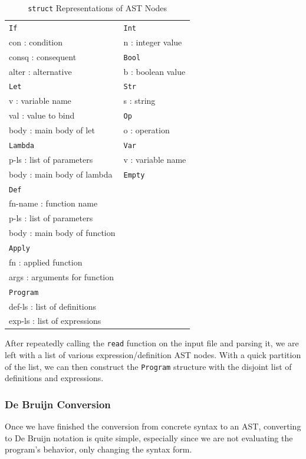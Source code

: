 \documentclass[12pt]{article}
\newcommand{\tab}{\hspace{6mm}}
\newcommand{\key}[1]{\texttt{#1}}
\begin{document}
\begin{table}[H]
  \begin{mdframed}
    \centering
    \begin{tabular}{ll}
      \key{If} & \key{Int} \\
      \tab con : condition & \tab n : integer value \\
      \tab consq : consequent & \key{Bool} \\
      \tab alter : alternative & \tab b : boolean value \\
      \key{Let} & \key{Str} \\
      \tab v : variable name & \tab s : string \\
      \tab val : value to bind & \key{Op} \\
      \tab body : main body of let & \tab o : operation \\
      \key{Lambda} & \key{Var} \\
      \tab p-ls : list of parameters & \tab v : variable name \\
      \tab body : main body of lambda & \key{Empty} \\
      \key{Def} \\
      \tab fn-name : function name \\
      \tab p-ls : list of parameters \\
      \tab body : main body of function \\
      \key{Apply} \\
      \tab fn : applied function \\
      \tab args : arguments for function \\
      \key{Program} \\
      \tab def-ls : list of definitions \\
      \tab exp-ls : list of expressions
    \end{tabular}
  \end{mdframed}
  \caption{\key{struct} Representations of AST Nodes}
  \label{ast-structs}
\end{table}

After repeatedly calling the \key{read} function on the input file and parsing it, we are left with a list of various expression/definition AST nodes. With a quick partition of the list, we can then construct the \key{Program} structure with the disjoint list of definitions and expressions.

\subsubsection{De Bruijn Conversion}
Once we have finished the conversion from concrete syntax to an AST, converting to De Bruijn notation is quite simple, especially since we are not evaluating the program's behavior, only changing the syntax form.
\end{document}

